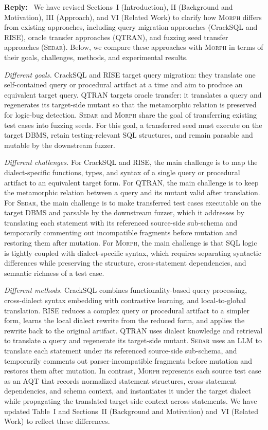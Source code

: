 \documentclass[12pt,letterpaper]{article}
\newcommand{\morph}{\textsc{Morph}}
\newcommand{\sedar}{\textsc{Sedar}}
\newcommand{\tool}{\morph}
\newcommand{\reply}{\par\nobreak\noindent\textbf{Reply:}\ }
\begin{document}
\reply
We have revised Sections~I (Introduction), II (Background and Motivation), III (Approach), and VI (Related Work) to clarify how \tool{} differs from existing approaches, including query migration approaches (CrackSQL and RISE), oracle transfer approaches (QTRAN), and fuzzing seed transfer approaches (\sedar{}). Below, we compare these approaches with \tool{} in terms of their goals, challenges, methods, and experimental results.

\textit{Different goals.} CrackSQL and RISE target query migration: they translate one self-contained query or procedural artifact at a time and aim to produce an equivalent target query. QTRAN targets oracle transfer: it translates a query and regenerates its target-side mutant so that the metamorphic relation is preserved for logic-bug detection. \sedar{} and \tool{} share the goal of transferring existing test cases into fuzzing seeds. For this goal, a transferred seed must execute on the target DBMS, retain testing-relevant SQL structures, and remain parsable and mutable by the downstream fuzzer.

\textit{Different challenges.} For CrackSQL and RISE, the main challenge is to map the dialect-specific functions, types, and syntax of a single query or procedural artifact to an equivalent target form. For QTRAN, the main challenge is to keep the metamorphic relation between a query and its mutant valid after translation. For \sedar{}, the main challenge is to make transferred test cases executable on the target DBMS and parsable by the downstream fuzzer, which it addresses by translating each statement with its referenced source-side sub-schema and temporarily commenting out incompatible fragments before mutation and restoring them after mutation. For \tool{}, the main challenge is that SQL logic is tightly coupled with dialect-specific syntax, which requires separating syntactic differences while preserving the structure, cross-statement dependencies, and semantic richness of a test case.

\textit{Different methods.} CrackSQL combines functionality-based query processing, cross-dialect syntax embedding with contrastive learning, and local-to-global translation. RISE reduces a complex query or procedural artifact to a simpler form, learns the local dialect rewrite from the reduced form, and applies the rewrite back to the original artifact. QTRAN uses dialect knowledge and retrieval to translate a query and regenerate its target-side mutant. \sedar{} uses an LLM to translate each statement under its referenced source-side sub-schema, and temporarily comments out parser-incompatible fragments before mutation and restores them after mutation. In contrast, \tool{} represents each source test case as an AQT that records normalized statement structures, cross-statement dependencies, and schema context, and instantiates it under the target dialect while propagating the translated target-side context across statements. We have updated Table~I and Sections~II (Background and Motivation) and~VI (Related Work) to reflect these differences.
\end{document}
